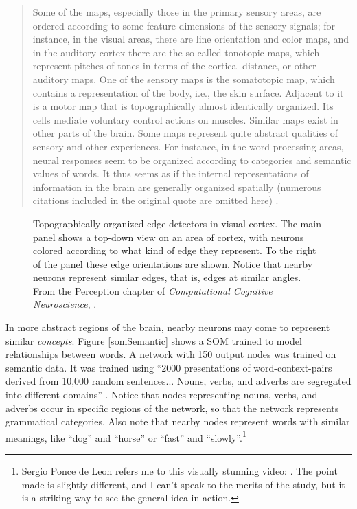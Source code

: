 \begin{quotation}
Some of the maps, especially those in the primary sensory areas, are ordered according to some feature dimensions of the sensory signals; for instance, in the visual areas, there are line orientation and color maps, and in the auditory cortex there are the so-called tonotopic maps, which represent pitches of tones in terms of the cortical distance, or other auditory maps. One of the sensory maps is the somatotopic map, which contains a representation of the body, i.e., the skin surface. Adjacent to it is a motor map that is topographically almost identically organized. Its cells mediate voluntary control actions on muscles. Similar maps exist in other parts of the brain. Some maps represent quite abstract qualities of sensory and other experiences. For instance, in the word-processing areas, neural responses seem to be organized according to categories and semantic values of words. It thus seems as if the internal representations of information in the brain are generally organized spatially (numerous citations included in the original quote are omitted here) \cite[p.~1465]{kohonen1990self}.
\end{quotation}

\begin{figure}[h]
\centering
{}
\caption[From O'Reilly et al., \emph{Computational Cognitive Neuroscience}, .]{Topographically organized edge detectors in visual cortex. The main panel shows a top-down view on an area of cortex, with neurons colored according to what kind of edge they represent. To the right of the panel these edge orientations are shown. Notice that nearby neurons represent similar edges, that is, edges at similar angles. From the Perception chapter of \emph{Computational Cognitive Neuroscience}, .}
\label{edgeDetectors}
\end{figure}

In more abstract regions of the brain, nearby neurons may come to represent similar \emph{concepts}. Figure \ref{somSemantic} shows a SOM trained to model relationships between words. A network with 150 output nodes was trained on semantic data. It was trained using ``2000 presentations of word-context-pairs derived from 10,000 random sentences... Nouns, verbs, and adverbs are segregated into different domains'' \cite[p.~1476]{kohonen1990self}. Notice that nodes representing nouns, verbs, and adverbs occur in specific regions of the network, so that the network represents grammatical categories. Also note that nearby nodes represent words with similar meanings, like ``dog'' and ``horse'' or ``fast'' and ``slowly''.\footnote{Sergio Ponce de Leon refers me to this visually stunning video: . The point made is slightly different, and I can't speak to the merits of the study, but it is a striking way to see the general idea in action.}

